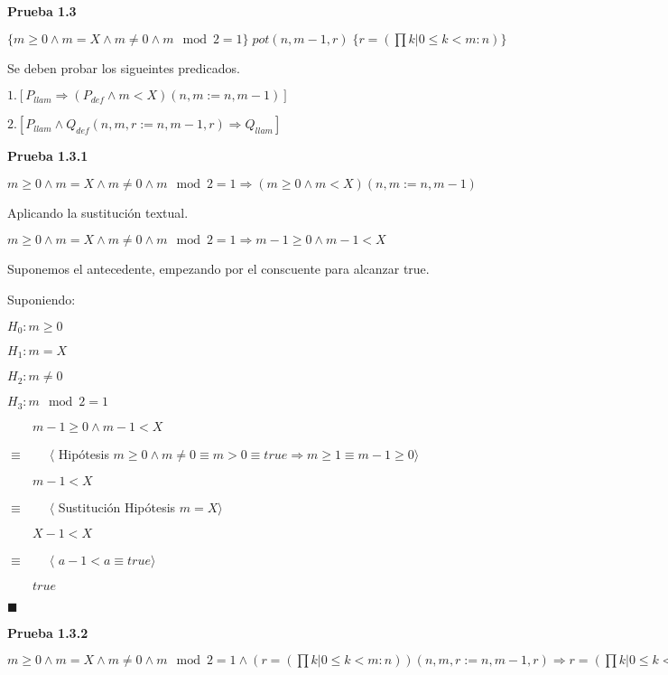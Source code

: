 \documentclass[hidelinks]{article}
\begin{document}
\textbf{Prueba 1.3}\par

$\{m \geq 0 \land m = X \land m \neq 0 \land m \mod 2 = 1\} \; pot(n, m - 1, r) \; \{r = (\prod k | 0 \leq k < m: n)\}$\par

Se deben probar los sigueintes predicados.\par

$1. [P_{llam} \Rightarrow (P_{def} \land m < X)(n,m := n, m - 1)]$\par
$2. [P_{llam} \land Q_{def}(n,m,r := n, m - 1, r) \Rightarrow Q_{llam}]$\par

\textbf{Prueba 1.3.1}

$m \geq 0 \land m = X \land m \neq 0 \land m \mod 2 = 1 \Rightarrow (m \geq 0 \land m < X)(n,m := n, m - 1)$\par

Aplicando la sustitución textual.\par

$m \geq 0 \land m = X \land m \neq 0 \land m \mod 2 = 1 \Rightarrow m - 1 \geq 0 \land m - 1 < X$\par

Suponemos el antecedente, empezando por el conscuente para alcanzar true.\par

Suponiendo:\par
$H_0: m \geq 0$\par
$H_1: m = X$\par
$H_2: m \neq 0$\par
$H_3: m \mod 2 = 1$\par

$\qquad m - 1 \geq 0 \land m - 1 < X$\par
$\equiv \qquad \langle$ Hipótesis $m \geq 0 \land m \neq 0 \equiv m > 0 \equiv true \Rightarrow m \geq 1 \equiv m - 1 \geq 0\rangle$\par
$\qquad m - 1 < X$\par
$\equiv \qquad \langle$ Sustitución Hipótesis $m = X\rangle$\par
$\qquad X - 1 < X$\par
$\equiv \qquad \langle$ $a - 1 < a \equiv true\rangle$\par
$\qquad true$\par
$\blacksquare$\par

\textbf{Prueba 1.3.2}

$m \geq 0 \land m = X \land m \neq 0 \land m \mod 2 = 1 \land (r = (\prod k | 0 \leq k < m: n))(n,m,r := n, m - 1, r) \Rightarrow r = (\prod k | 0 \leq k < m: n)$\par
\end{document}
